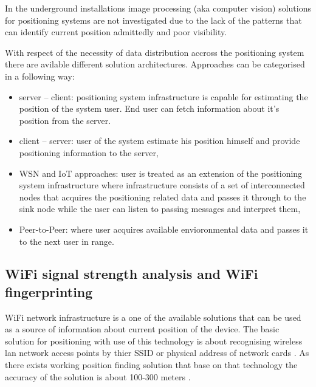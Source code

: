 \documentclass[../main.tex]{subfiles}
\begin{document}
In the underground installations image processing (aka computer vision) solutions for positioning systems are not investigated due to the lack of the patterns that can identify current position admittedly and poor visibility.

With respect of the necessity of data distribution accross the positioning system there are avilable different solution architectures. Approaches can be categorised in a following way:
\begin{itemize}
	\item server -- client: positioning system infrastructure is capable for estimating the position of the system user. End user can fetch information about it's position from the server.
	\item client -- server: user of the system estimate his position himself and provide positioning information to the server,
	\item WSN and IoT approaches: user is treated as an extension of the positioning system infrastructure where infrastructure consists of a set of interconnected nodes that acquires the positioning related data and passes it through to the sink node while the user can listen to passing messages and interpret them,
	\item Peer-to-Peer: where user acquires available envioronmental data and passes it to the next user in range.
\end{itemize}


\subsection{WiFi signal strength analysis and WiFi fingerprinting} %
\label{sub:wifi_fingerprinting}

WiFi network infrastructure is a one of the available solutions that can be used as a source of information about current position of the device. The basic solution for positioning with use of this technology is about recognising wireless lan network access points by thier SSID or physical address of network cards \cite{WLAN_fingerprinting}. As there exists working position finding solution that base on that technology the accuracy of the solution is about 100-300 meters \cite{thesis_tablet_positioning}.
\end{document}

